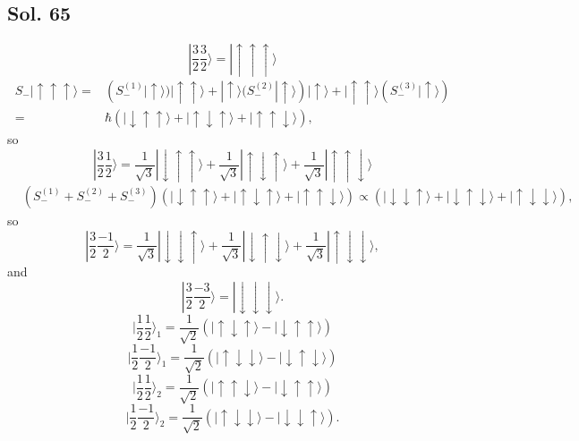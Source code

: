 \subsection*{Sol. 65}
$$
|\frac{3}{2}\frac{3}{2}\rangle = 
|\uparrow\uparrow\uparrow\rangle
$$
\begin{align*}
    S_-|\uparrow\uparrow\uparrow\rangle
=&(S_-^{(1)}|\uparrow\rangle)|\uparrow\uparrow\rangle
+|\uparrow\rangle(S_-^{(2)}|\uparrow\rangle)|\uparrow\rangle
+
|\uparrow\uparrow\rangle(S_-^{(3)}|\uparrow\rangle)\\
=&\hbar
(|\downarrow\uparrow\uparrow\rangle + 
|\uparrow\downarrow\uparrow\rangle
+|\uparrow\uparrow\downarrow\rangle
),
\end{align*}
so 
$$
|\frac{3}{2}\frac{1}{2}\rangle = 
\frac{1}{\sqrt{3}}|\downarrow\uparrow\uparrow\rangle + 
\frac{1}{\sqrt{3}}|\uparrow\downarrow\uparrow\rangle+
\frac{1}{\sqrt{3}}|\uparrow\uparrow\downarrow\rangle
$$
\begin{align*}
    &(S_-^{(1)} + S_-^{(2)} + S_-^{(3)})
 (|\downarrow\uparrow\uparrow\rangle + 
|\uparrow\downarrow\uparrow\rangle
+|\uparrow\uparrow\downarrow\rangle
)
\propto
(|\downarrow\downarrow\uparrow\rangle + |\downarrow\uparrow\downarrow\rangle +
|\uparrow\downarrow\downarrow\rangle),
\end{align*}
so 
$$
|\frac{3}{2}\frac{-1}{2}\rangle = 
\frac{1}{\sqrt{3}}|\downarrow\downarrow\uparrow\rangle + 
\frac{1}{\sqrt{3}}|\downarrow\uparrow\downarrow\rangle+
\frac{1}{\sqrt{3}}|\uparrow\downarrow\downarrow\rangle,
$$
and 
$$
|\frac{3}{2}\frac{-3}{2}\rangle = 
|\downarrow\downarrow\downarrow\rangle.
$$
$$
|\frac{1}{2}\frac{1}{2}\rangle_1
=\frac{1}{\sqrt{2}}
(|\uparrow\downarrow\uparrow\rangle-|\downarrow\uparrow\uparrow\rangle)
$$
$$
|\frac{1}{2}\frac{-1}{2}\rangle_1
=
\frac{1}{\sqrt{2}}
(|\uparrow\downarrow\downarrow\rangle-|\downarrow\uparrow\downarrow\rangle)
$$
$$
|\frac{1}{2}\frac{1}{2}\rangle_2
=\frac{1}{\sqrt{2}}
(|\uparrow\uparrow\downarrow\rangle - |\downarrow\uparrow\uparrow\rangle)
$$
$$
|\frac{1}{2}\frac{-1}{2}\rangle_2   
=
\frac{1}{\sqrt{2}}
(|\uparrow\downarrow\downarrow\rangle - |\downarrow\downarrow\uparrow\rangle).
$$

